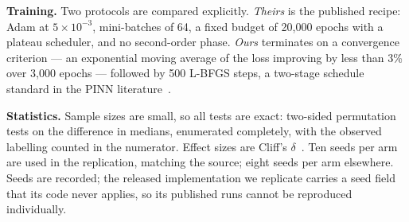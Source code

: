 \documentclass[conference,a4paper]{IEEEtran}
\begin{document}
\textbf{Training.} Two protocols are compared explicitly. \emph{Theirs} is the published
recipe: Adam at $5\times10^{-3}$, mini-batches of 64, a fixed budget of 20{,}000 epochs
with a plateau scheduler, and no second-order phase. \emph{Ours} terminates on a
convergence criterion --- an exponential moving average of the loss improving by less than
3\% over 3{,}000 epochs --- followed by 500 L-BFGS steps, a two-stage schedule standard in
the PINN literature~\cite{raissi}.

\textbf{Statistics.} Sample sizes are small, so all tests are exact: two-sided permutation
tests on the difference in medians, enumerated completely, with the observed labelling
counted in the numerator. Effect sizes are Cliff's $\delta$~\cite{cliff}. Ten seeds per arm are used in
the replication, matching the source; eight seeds per arm elsewhere. Seeds are recorded;
the released implementation we replicate carries a seed field that its code never applies,
so its published runs cannot be reproduced individually.
\end{document}
